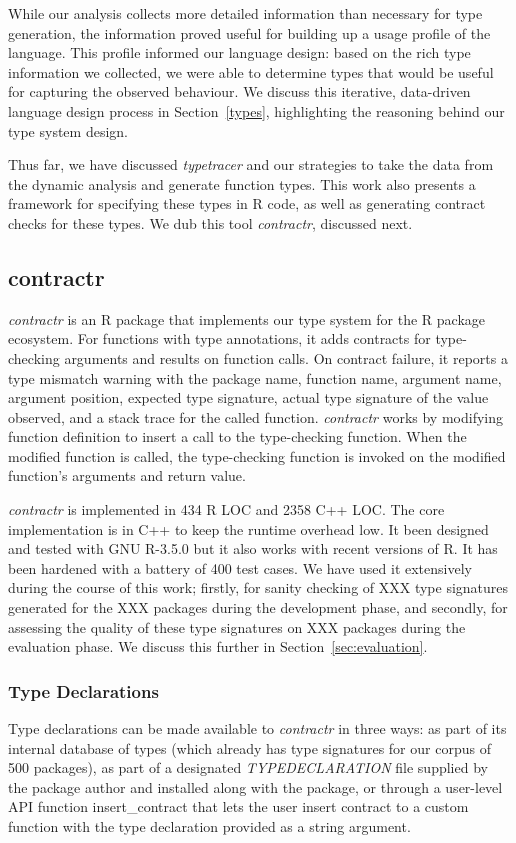 \documentclass[acmsmall,review,anonymous]{acmart}\settopmatter{printfolios=true,printccs=false,printacmref=false}
\newcommand{\contractr}{\emph{contractr}\xspace} %
\newcommand{\typetracer}{\emph{typetracer}\xspace} %
\begin{document}
While our analysis collects more detailed information than necessary for
type generation, the information proved useful for building up a usage
profile of the language.  This profile informed our language design: based
on the rich type information we collected, we were able to determine types
that would be useful for capturing the observed behaviour.  We discuss this
iterative, data-driven language design process in Section~\ref{types},
highlighting the reasoning behind our type system design.

Thus far, we have discussed \typetracer and our strategies to take the data
from the dynamic analysis and generate function types.  This work also
presents a framework for specifying these types in R code, as well as
generating contract checks for these types.  We dub this tool \contractr,
discussed next.

%
%
%
\subsection{contractr}
\label{sec:contractr}

\contractr is an R package that implements our type system for the R
package ecosystem. For functions with type annotations, it adds contracts for type-checking
arguments and results on function calls. On contract failure, it reports a type
mismatch warning with the package name, function name, argument name, argument
position, expected type signature, actual type signature of the value observed,
and a stack trace for the called function. \contractr works by modifying
function definition to insert a call to the type-checking function. When the
modified function is called, the type-checking function is invoked on the
modified function's arguments and return value.

\contractr is implemented in 434 R LOC and 2358 C++ LOC. The core
implementation is in C++ to keep the runtime overhead low. It been designed and
tested with GNU R-3.5.0 but it also works with recent versions of R. It has been
hardened with a battery of 400 test cases. We have used it extensively during
the course of this work; firstly, for sanity checking of XXX type signatures
generated for the XXX packages during the development phase, and secondly, for
assessing the quality of these type signatures on XXX packages during the
evaluation phase. We discuss this further in Section~\ref{sec:evaluation}.

%
%
\subsubsection{Type Declarations}
Type declarations can be made available to \contractr in three ways: as
part of its internal database of types (which already has type signatures for
our corpus of 500 packages), as part of a designated \emph{TYPEDECLARATION} file
supplied by the package author and installed along with the package, or through
a user-level API function insert\_contract that lets the user insert contract to
a custom function with the type declaration provided as a string argument.
\end{document}
